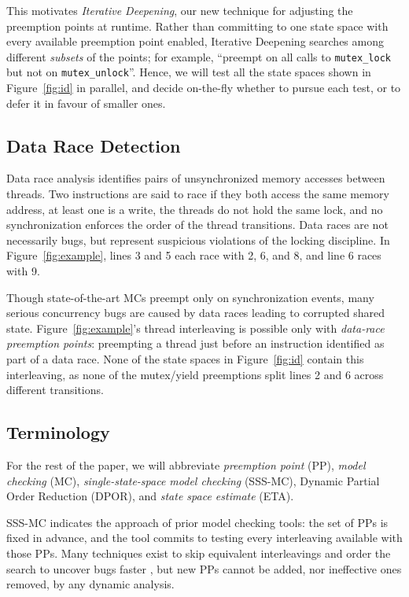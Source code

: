 This motivates {\em Iterative Deepening}, our new technique for adjusting the preemption points at runtime.
Rather than committing to one state space with every available preemption point enabled,
Iterative Deepening searches among different {\em subsets} of the points;
for example, ``preempt on all calls to {\tt mutex\_lock} but not on {\tt mutex\_unlock}''.
Hence, we will test all the state spaces shown in Figure~\ref{fig:id} in parallel,
and decide on-the-fly whether to pursue each test, or to defer it in favour of smaller ones.

\subsection{Data Race Detection}

Data race analysis \cite{eraser} identifies pairs of unsynchronized memory accesses between threads.
Two instructions are said to race if
they both access the same memory address,
at least one is a write,
the threads do not hold the same lock,
and no synchronization enforces the order of the thread transitions.
Data races are not necessarily bugs, but represent suspicious violations of the locking discipline.
In Figure~\ref{fig:example}, lines 3 and 5 each race with 2, 6, and 8, and line 6 races with 9.

Though state-of-the-art MCs preempt only on synchronization events,
many serious concurrency bugs are caused by data races leading to corrupted shared state.
Figure~\ref{fig:example}'s thread interleaving is possible only with {\em data-race preemption points}:
preempting a thread just before an instruction identified as part of a data race.
None of the state spaces in Figure~\ref{fig:id} contain this interleaving,
as none of the mutex/yield preemptions split lines 2 and 6 across different transitions.

\subsection{Terminology}

For the rest of the paper, we will abbreviate {\em preemption point} (PP),
{\em model checking} (MC),
{\em single-state-space model checking} (SSS-MC), %
Dynamic Partial Order Reduction (DPOR), and {\em state space estimate} (ETA).

SSS-MC indicates the approach of prior model checking tools:
the set of PPs is fixed in advance, and the tool commits to testing every interleaving available with those PPs.
Many techniques exist to skip equivalent interleavings and order the search to uncover bugs faster \cite{dpor,demeter,chess-icb,gambit},
but new PPs cannot be added, nor ineffective ones removed, by any dynamic analysis.

